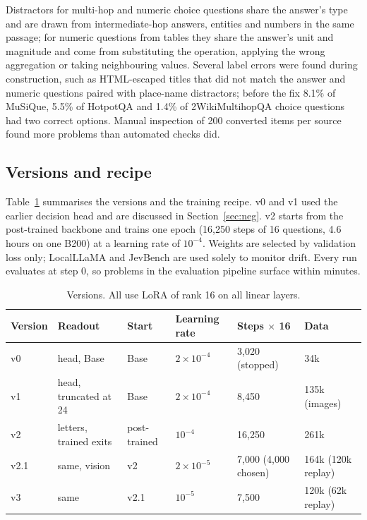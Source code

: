 \documentclass[10pt]{article}
\begin{document}
Distractors for multi-hop and numeric choice questions share the answer's type and are drawn from intermediate-hop answers, entities and numbers in the same passage; for numeric questions from tables they share the answer's unit and magnitude and come from substituting the operation, applying the wrong aggregation or taking neighbouring values.
Several label errors were found during construction, such as HTML-escaped titles that did not match the answer and numeric questions paired with place-name distractors; before the fix 8.1\% of MuSiQue, 5.5\% of HotpotQA and 1.4\% of 2WikiMultihopQA choice questions had two correct options.
Manual inspection of 200 converted items per source found more problems than automated checks did.

\subsection{Versions and recipe}

Table~\ref{tab:versions} summarises the versions and the training recipe.
v0 and v1 used the earlier decision head and are discussed in Section~\ref{sec:neg}.
v2 starts from the post-trained backbone and trains one epoch (16,250 steps of 16 questions, 4.6 hours on one B200) at a learning rate of $10^{-4}$.
Weights are selected by validation loss only; LocalLLaMA and JevBench are used solely to monitor drift.
Every run evaluates at step 0, so problems in the evaluation pipeline surface within minutes.

\begin{table}[t]
\centering\small
\caption{Versions. All use LoRA of rank 16 on all linear layers.}
\label{tab:versions}
\setlength{\tabcolsep}{4pt}\footnotesize
\begin{tabular}{llllll}
\toprule
Version & Readout & Start & Learning rate & Steps $\times$ 16 & Data \\
\midrule
v0 & head, Base & Base & $2\times10^{-4}$ & 3,020 (stopped) & 34k \\
v1 & head, truncated at 24 & Base & $2\times10^{-4}$ & 8,450 & 135k (images) \\
v2 & letters, trained exits & post-trained & $10^{-4}$ & 16,250 & 261k \\
v2.1 & same, vision & v2 & $2\times10^{-5}$ & 7,000 (4,000 chosen) & 164k (120k replay) \\
v3 & same & v2.1 & $10^{-5}$ & 7,500 & 120k (62k replay) \\
\bottomrule
\end{tabular}
\end{table}
\end{document}
